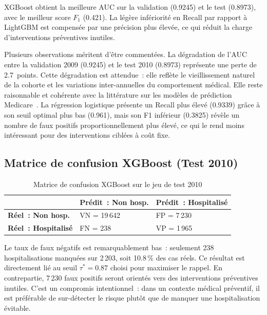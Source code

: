 \begin{resultatbox}
XGBoost obtient la meilleure AUC sur la validation (0.9245) et le test (0.8973),
avec le meilleur score $F_1$ (0.421). La légère infériorité en Recall par
rapport à LightGBM est compensée par une précision plus élevée, ce qui réduit
la charge d'interventions préventives inutiles.
\end{resultatbox}

Plusieurs observations méritent d'être commentées. La dégradation de l'AUC entre
la validation 2009 (0.9245) et le test 2010 (0.8973) représente une perte de 2.7~points.
Cette dégradation est attendue~: elle reflète le vieillissement naturel de la cohorte
et les variations inter-annuelles du comportement médical. Elle reste raisonnable et
cohérente avec la littérature sur les modèles de prédiction Medicare~\cite{anderson2021using}.
La régression logistique présente un Recall plus élevé (0.9339) grâce à son seuil optimal
plus bas (0.961), mais son F1 inférieur (0.3825) révèle un nombre de faux positifs
proportionnellement plus élevé, ce qui le rend moins intéressant pour des interventions
ciblées à coût fixe.

\subsection{Matrice de confusion XGBoost (Test 2010)}

\begin{table}[htbp]
\centering
\caption{Matrice de confusion XGBoost sur le jeu de test 2010}
\label{tab:confusion}
\begin{tabular}{@{}lll@{}}
\toprule
 & \textbf{Prédit~: Non hosp.} & \textbf{Prédit~: Hospitalisé} \\
\midrule
\textbf{Réel~: Non hosp.}  & VN = 19\,642 & FP = 7\,230 \\
\textbf{Réel~: Hospitalisé} & FN = 238    & VP = 1\,965 \\
\bottomrule
\end{tabular}
\end{table}

Le taux de faux négatifs est remarquablement bas~: seulement 238 hospitalisations
manquées sur 2\,203, soit 10.8\,\% des cas réels. Ce résultat est directement lié
au seuil $\tau^* = 0.87$ choisi pour maximiser le rappel. En contrepartie, 7\,230
faux positifs seront orientés vers des interventions préventives inutiles. C'est un
compromis intentionnel~: dans un contexte médical préventif, il est préférable de
sur-détecter le risque plutôt que de manquer une hospitalisation évitable.

